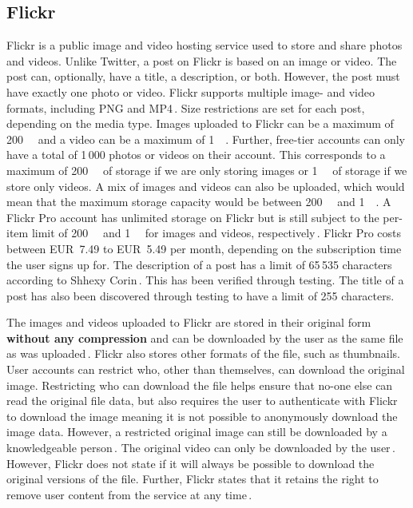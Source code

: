 \subsection{Flickr}
\label{subsec:ows_flickr}
Flickr is a public image and video hosting service used to store and share photos and videos. Unlike Twitter, a post on Flickr is based on an image or video. The post can, optionally, have a title, a description, or both. However, the post must have exactly one photo or video. Flickr supports multiple image- and video formats, including PNG and MP4\,\cite{FlickrUploadRequirements2022}. Size restrictions are set for each post, depending on the media type. Images uploaded to Flickr can be a maximum of \SI{200}{\mega\byte} and a video can be a maximum of \SI{1}{\giga\byte}. Further, \mbox{free-tier} accounts can only have a total of 1\,000 photos or videos on their account. This corresponds to a maximum of \SI{200}{\giga\byte} of storage if we are only storing images or \SI{1}{\tera\byte} of storage if we store only videos. A mix of images and videos can also be uploaded, which would mean that the maximum storage capacity would be between \SI{200}{\giga\byte} and \SI{1}{\tera\byte}. A Flickr Pro account has unlimited storage on Flickr but is still subject to the \mbox{per-item} limit of \SI{200}{\mega\byte} and \SI{1}{\giga\byte} for images and videos, respectively\,\cite{flickrinc.UpgradeEverythingYou}. Flickr Pro costs between EUR~7.49 to EUR~5.49 per month, depending on the subscription time the user signs up for. The description of a post has a limit of 65\,535 characters according to Shhexy Corin\,\cite{FlickrHelpForum2009}. This has been verified through testing. The title of a post has also been discovered through testing to have a limit of 255 characters.

The images and videos uploaded to Flickr are stored in their original form \textbf{without any compression} and can be downloaded by the user as the same file as was uploaded\,\cite{flickrinc.DownloadPermissions}. Flickr also stores other formats of the file, such as thumbnails. User accounts can restrict who, other than themselves, can download the original image. Restricting who can download the file helps ensure that \mbox{no-one} else can read the original file data, but also requires the user to authenticate with Flickr to download the image meaning it is not possible to anonymously download the image data. However, a restricted original image can still be downloaded by a knowledgeable person\,\cite{FlickrHelpForum2020}. The original video can only be downloaded by the user\,\cite{flickrinc.DownloadPermissions}. However, Flickr does not state if it will always be possible to download the original versions of the file. Further, Flickr states that it retains the right to remove user content from the service at any time\,\cite{flickrinc.FlickrTermsConditions2020}.

